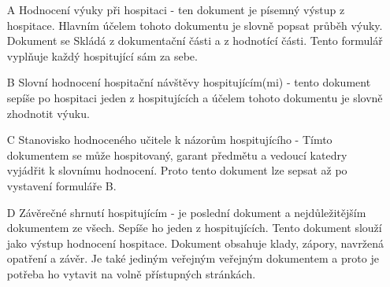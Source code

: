 \label{sec:formulare}
\begin{itemize}
\item[A] Hodnocení výuky při hospitaci - ten dokument  je písemný výstup z hospitace. Hlavním účelem tohoto dokumentu je slovně popsat průběh výuky. Dokument se Skládá z dokumentační části a z hodnotící části. Tento formulář vyplňuje každý hospitující sám za sebe.
\item[B] Slovní hodnocení hospitační návštěvy hospitujícím(mi) - tento dokument sepíše po hospitaci jeden z hospitujících a účelem tohoto dokumentu je slovně zhodnotit výuku. 
\item[C] Stanovisko hodnoceného učitele k názorům hospitujícího - Tímto dokumentem se může hospitovaný, garant předmětu a vedoucí katedry vyjádřit k slovnímu hodnocení. Proto tento dokument lze sepsat až po vystavení formuláře B.
\item[D] Závěrečné shrnutí hospitujícím - je poslední dokument a nejdůležitějším dokumentem ze všech. Sepíše ho jeden z hospitujících. Tento dokument slouží jako výstup hodnocení hospitace. Dokument obsahuje klady, zápory, navržená opatření a závěr. Je také jediným veřejným veřejným dokumentem a proto je potřeba ho vytavit na volně přístupných stránkách.
\end{itemize}